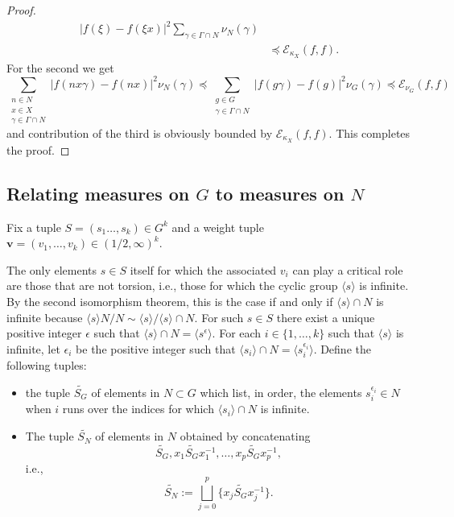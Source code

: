 \documentclass[pdflatex,sn-mathphys-num]{sn-jnl}%
\theoremstyle{thmstyleone}%
\theoremstyle{thmstyletwo}%
\theoremstyle{thmstylethree}%
\begin{document}
\begin{proof}
\begin{align*}
|f(\xi) 
 -f(\xi x) |^2 \sum_{\gamma \in \Gamma \cap N}\nu_N(\gamma ) \\
 & \preccurlyeq \mathcal{E}_{\kappa_X}(f,f) .
\end{align*}
For the second we get
$$  \sum_{\substack{n\in N\\ x \in X \\ \gamma \in \Gamma \cap N}}  
 |f(n x\gamma  ) - f(nx)|^2  \nu_N(\gamma)
 \preccurlyeq \sum_{\substack{g\in G\\ \gamma \in \Gamma \cap N}}  
 |f(g\gamma  ) - f(g)|^2  \nu_G(\gamma) \preccurlyeq\mathcal{E}_{\nu_G}(f,f)$$
and contribution of the third is obviously bounded by $\mathcal{E}_{\kappa_X}(f,f)$. This completes the proof. 
\end{proof} 

\subsection{Relating measures on $G$ to measures on $N$} 
\label{sec: G_to_N}
Fix a tuple $S=(s_1\dots,s_k) \in G^k$ and a weight tuple $\mathbf{v}=(v_1,\dots,v_k)\in (1/2,\infty)^k$. 


The only elements $s \in S$ itself for which the associated $v_i$ can play a critical role  are those that are not torsion, i.e., those for which the cyclic group  $\langle s\rangle $ is infinite. By the second isomorphism theorem, this is the case if and only if $\langle s\rangle \cap N$ is infinite because
$\langle s\rangle N/N\sim \langle s\rangle /\langle s\rangle \cap N$.
For such $s\in S$ there exist a unique positive integer $\epsilon$ such that $\langle s\rangle \cap N=\langle s^\epsilon\rangle$. For each $i\in \{1,\dots,k\} $ such that $\langle s\rangle$ is infinite, let $\epsilon_i$ be the positive integer such that $\langle s_i\rangle \cap N=\langle s_i^{\epsilon_i}\rangle$. Define the following tuples:
\begin{itemize}
\item the tuple $\widetilde{S_G}$ of elements in $N\subset G$ which list, in order,
the elements $s_i^{\epsilon_i}\in N$ when $i$ runs over the indices for which $\langle s_i\rangle \cap N$ is infinite.
\item The tuple $\widetilde{S_N}$ of elements in $N$ obtained by concatenating  
$$\widetilde{S_G}, x_1\widetilde{S_G} x_1^{-1},\dots,x_p\widetilde{S_G}x_p^{-1},$$ i.e.,
$$\widetilde{S_N} :=  \bigsqcup_{j=0}^p \{x_j \widetilde{S_G} x_j^{-1}\} .$$ 
\end{itemize}
\end{document}
